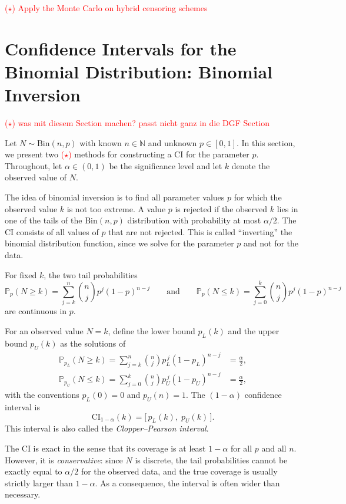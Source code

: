 \textcolor{red}{($\star$) Apply the Monte Carlo on hybrid censoring schemes}

\section{Confidence Intervals for the Binomial Distribution: Binomial Inversion}
\textcolor{red}{($\star$) was mit diesem Section machen? passt nicht ganz in die DGF Section}

Let $N \sim \text{Bin}(n, p)$ with known $n \in \mathbb{N}$ and unknown $p \in [0, 1]$.
In this section, we present two \textcolor{red}{($\star$)} methods for constructing a CI for the parameter $p$.
Throughout, let $\alpha \in (0,1)$ be the significance level and let $k$ denote the observed value of $N$.


The idea of binomial inversion is to find all parameter values $p$ for which the observed value $k$ is not too extreme.
A value $p$ is rejected if the observed $k$ lies in one of the tails of the $\text{Bin}(n,p)$ distribution with probability at most $\alpha/2$.
The CI consists of all values of $p$ that are not rejected.
This is called ``inverting'' the binomial distribution function, since we solve for the parameter $p$ and not for the data.

For fixed $k$, the two tail probabilities
\[
\mathbb{P}_p(N \geq k) = \sum_{j=k}^{n} \binom{n}{j} p^j (1-p)^{n-j}
\qquad \text{and} \qquad
\mathbb{P}_p(N \leq k) = \sum_{j=0}^{k} \binom{n}{j} p^j (1-p)^{n-j}
\]
are continuous in $p$. 

For an observed value $N = k$, define the lower bound $p_L(k)$ and the upper bound $p_U(k)$ as the solutions of
\begin{align*}
	\mathbb{P}_{p_L}(N \geq k) = \sum_{j=k}^{n} \binom{n}{j} p_L^{\,j} (1-p_L)^{n-j} &= \frac{\alpha}{2}, \\
	\mathbb{P}_{p_U}(N \leq k) = \sum_{j=0}^{k} \binom{n}{j} p_U^{\,j} (1-p_U)^{n-j} &= \frac{\alpha}{2},
\end{align*}
with the conventions $p_L(0) = 0$ and $p_U(n) = 1$.
The $(1-\alpha)$ confidence interval is
\[
\text{CI}_{1-\alpha}(k) = \big[\, p_L(k),\; p_U(k) \,\big].
\]
This interval is also called the \emph{Clopper--Pearson interval}.


The CI is exact in the sense that its coverage is at least $1-\alpha$ for all $p$ and all $n$.
However, it is \emph{conservative}: since $N$ is discrete, the tail probabilities cannot be exactly equal to $\alpha/2$ for the observed data, and the true coverage is usually strictly larger than $1-\alpha$.
As a consequence, the interval is often wider than necessary.

